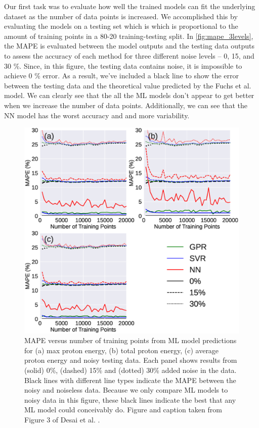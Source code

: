 Our first task was to evaluate how well the trained models can fit the underlying dataset as the number of data points is increased. We accomplished this by evaluating the models on a testing set which is which is proportional to the amount of training points in a 80-20 training-testing split. In \autoref{fig:mape_3levels}, the \gls{MAPE} is evaluated between the model outputs and the testing data outputs to assess the accuracy of each method for three different noise levels -- 0, 15, and 30 \%. Since, in this figure, the testing data contains noise, it is impossible to achieve 0 \% error. As a result, we've included a black line to show the error between the testing data and the theoretical value predicted by the Fuchs et al. model. We can clearly see that the all the \gls{ML} models don't appear to get better when we increase the number of data points.  Additionally, we can see that the \gls{NN} model has the worst accuracy and and more variability.

\begin{figure}
	\centering 
	\includegraphics[width=0.75\linewidth]{planning/images/paper1/test_mape_3levels.eps}
	\caption{\gls{MAPE} versus number of training points from \gls{ML} model predictions for (a) max proton energy, (b) total proton energy, (c) average proton energy and noisy testing data. Each panel shows results from (solid) 0\%, (dashed) 15\% and (dotted) 30\% added noise in the data. Black lines with different line types indicate the \gls{MAPE} between the noisy and noiseless data. Because we only compare \gls{ML} models to noisy data in this figure, these black lines indicate the best that any \gls{ML} model could conceivably do. Figure and caption taken from Figure 3 of Desai et al. \cite{Desai_2024_CPP}.}
	\label{fig:mape_3levels}
\end{figure}

